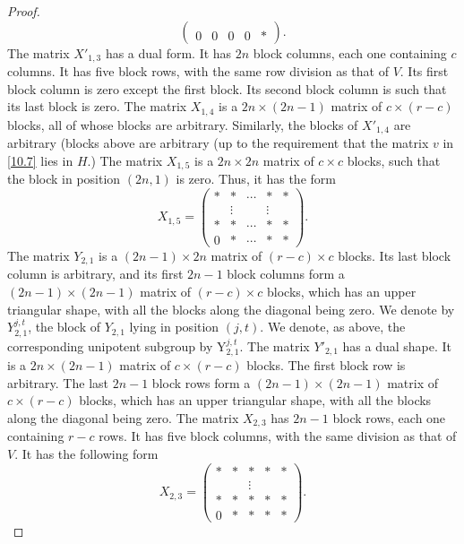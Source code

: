 \documentclass[12pts]{amsart}
\begin{document}
\begin{proof}
\begin{equation}
\begin{pmatrix}
\\0&0&0&0&\ast\end{pmatrix}.
\end{equation}
The matrix $X'_{1,3}$ has a dual form. It has $2n$ block columns, each one containing $c$ columns. It has five block rows, with the same row division as that of $V$. Its first block column is zero except the first block. Its second block column is such that its last block is zero. The matrix $X_{1,4}$ is a $2n\times (2n-1)$ matrix of $c\times (r-c)$ blocks, all of whose blocks are arbitrary. Similarly, the blocks of $X'_{1,4}$ are arbitrary (blocks above are arbitrary (up to the requirement that the matrix $v$ in \eqref{10.7} lies in $H$.) The matrix $X_{1,5}$ is a $2n\times 2n$ matrix of $c\times c$ blocks, such that the block in position $(2n,1)$ is zero. Thus, it has the form
\begin{equation}\label{10.12}
X_{1,5}=\begin{pmatrix}\ast&\ast&\cdots&\ast&\ast\\
&\vdots&&\vdots\\\ast&\ast&\cdots&\ast&\ast\\0&\ast&\cdots&\ast&\ast\end{pmatrix}.
\end{equation}
The matrix $Y_{2,1}$ is a $(2n-1)\times 2n$ matrix of $(r-c)\times c$ blocks. Its last block column is arbitrary, and its first $2n-1$ block columns form a $(2n-1)\times (2n-1)$ matrix of $(r-c)\times c$ blocks, which has an upper triangular shape, with all the blocks along the diagonal being zero. We denote by $Y_{2,1}^{j,t}$, the block of $Y_{2,1}$ lying in position $(j,t)$. We denote, as above, the corresponding unipotent subgroup by $\mathrm{Y}_{2,1}^{j,t}$. The matrix $Y'_{2,1}$ has a dual shape. It is a $2n\times (2n-1)$ matrix of $c\times (r-c)$ blocks. The first block row is arbitrary. The last $2n-1$ block rows form a $(2n-1)\times (2n-1)$ matrix of $c\times (r-c)$ blocks, which has an upper triangular shape, with all the blocks along the diagonal being zero. The matrix $X_{2,3}$ has $2n-1$ block rows, each one containing $r-c$ rows. It has five block columns, with the same division as that of $V$. It has the following form\begin{equation}\label{10.13}
X_{2,3}=\begin{pmatrix}\ast&\ast&\ast&\ast&\ast\\&&\vdots\\ \ast&\ast&\ast&\ast&\ast\\0&\ast&\ast&\ast&\ast\end{pmatrix}.

\end{equation}
\end{proof}
\end{document}
